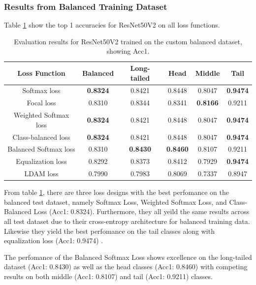 \subsubsection{Results from Balanced Training Dataset}

Table \ref{tab:resnet_bal_acc1_1} show the top 1 accuracies for ResNet50V2 on all loss functions.

\begin{table}[H]
    \centering
    \caption{Evaluation results for ResNet50V2 trained on the custom balanced dataset, showing Acc1.}
    \begin{tabular}{cccccc}
        \toprule
        Loss Function & Balanced & Long-tailed & Head & Middle & Tail \\ 
        \midrule
        Softmax loss   & \textbf{0.8324}  & 0.8421 & 0.8448 & 0.8047 & \textbf{0.9474} \\
        Focal loss   & 0.8310  & 0.8344 & 0.8341 & \textbf{0.8166} & 0.9211 \\
        Weighted Softmax loss   & \textbf{0.8324} & 0.8421 & 0.8448 & 0.8047 & \textbf{0.9474} \\
        Class-balanced loss   &  \textbf{0.8324} & 0.8421 & 0.8448 & 0.8047 & \textbf{0.9474} \\
        Balanced Softmax loss   & 0.8310 & \textbf{0.8430} & \textbf{0.8460} & 0.8107 & 0.9211 \\
        Equalization loss   & 0.8292 & 0.8373 & 0.8412 & 0.7929 & \textbf{0.9474} \\
        LDAM loss   & 0.7990 & 0.7983 & 0.8069 & 0.7337 & 0.8947 \\
        \bottomrule
    \end{tabular}
    \label{tab:resnet_bal_acc1_1}
\end{table}

From table \ref{tab:resnet_bal_acc1_1}, there are three loss designs with the best perfomance on the balanced test dataset, namely Softmax Loss, Weighted Softmax Loss, and Class-Balanced Loss (Acc1: 0.8324). Furthermore, they all yeild the same results across all test dataset due to their cross-entropy architecture for balanced training data. Likewise they yield the best perfomance on the tail classes along with equalization loss (Acc1: 0.9474) . %

The perfomance of the Balanced Softmax Loss shows excellence on the long-tailed dataset (Acc1: 0.8430) as well as the head classes (Acc1: 0.8460) with competing results on both middle (Acc1: 0.8107) and tail (Acc1: 0.9211) classes.

